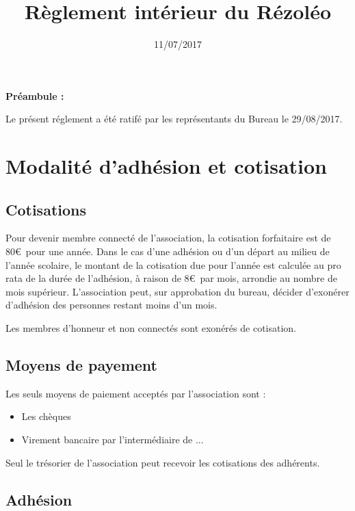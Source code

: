 \documentclass[12pt]{article}
\begin{document}
\title{Règlement intérieur du Rézoléo}
\author{}
\date{11/07/2017}
\maketitle

\textbf{\large{Préambule : \\}}

\noindent Le présent réglement a été ratifé par les représentants du Bureau le  29/08/2017.

\newpage

\tableofcontents

\newpage

\section{Modalité d'adhésion et cotisation}
	\subsection{Cotisations}

		Pour devenir membre connecté de l'association, la cotisation forfaitaire est de 80\euro \ pour une année. Dans le cas d'une adhésion ou d'un départ au milieu de l'année scolaire, le montant de la cotisation due pour l'année est calculée au pro rata de la durée de l'adhésion, à raison de 8\euro \ par mois, arrondie au nombre de mois supérieur. L'association peut, sur approbation du bureau, décider d'exonérer d'adhésion des personnes restant moins d'un mois.

		Les membres d'honneur et non connectés sont exonérés de cotisation.

    \subsection{Moyens de payement}

		Les seuls moyens de paiement acceptés par l'association sont :

			\begin{itemize}
		    	\item[\textbullet] Les chèques
		    	\item[\textbullet] Virement bancaire par l'intermédiaire de ... 
		    \end{itemize}

		Seul le trésorier de l'association peut recevoir les cotisations des adhérents.


    \subsection{Adhésion}
\end{document}

